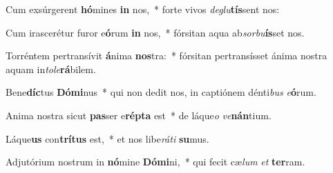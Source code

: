 \item Cum exsúrgerent \textbf{hó}mines \textbf{in} nos,~* forte vivos \textit{de}\textit{glu}\textbf{tís}sent nos:
\item Cum irascerétur furor e\textbf{ó}rum \textbf{in} nos,~* fórsitan aqua ab\textit{sor}\textit{bu}\textbf{ís}set nos.
\item Torréntem pertransívit \textbf{á}nima \textbf{nos}tra:~* fórsitan pertransísset ánima nostra aquam in\textit{to}\textit{le}\textbf{rá}bilem.
\item Bene\textbf{díc}tus \textbf{Dó}\textbf{mi}nus~* qui non dedit nos, in captiónem dénti\textit{bus} \textit{e}\textbf{ó}rum.
\item Anima nostra sicut \textbf{pas}ser e\textbf{rép}\textbf{ta} est~* de láque\textit{o} \textit{ve}\textbf{nán}tium.
\item Láque\textbf{us} con\textbf{trí}\textbf{tus} est,~* et nos libe\textit{rá}\textit{ti} \textbf{su}mus.
\item Adjutórium nostrum in \textbf{nó}mine \textbf{Dó}\textbf{mi}ni,~* qui fecit cæ\textit{lum} \textit{et} \textbf{ter}ram.
